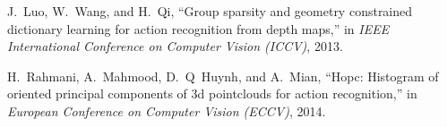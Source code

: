 \documentclass[9pt,technote,compsoc]{IEEEtran}
\begin{document}
\begin{thebibliography}{10}
	J.~Luo, W.~Wang, and H.~Qi, ``Group sparsity and geometry constrained
	dictionary learning for action recognition from depth maps,'' in \emph{IEEE
		International Conference on Computer Vision (ICCV)}, 2013.
	
	H.~Rahmani, A.~Mahmood, D.~Q~Huynh, and A.~Mian, ``Hopc: Histogram of oriented
	principal components of 3d pointclouds for action recognition,'' in
	\emph{European Conference on Computer Vision (ECCV)}, 2014.
	
\end{thebibliography}
\end{document}
